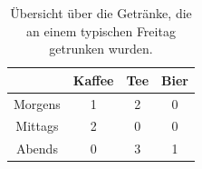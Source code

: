 \begin{table}[tb]
    \centering
    \begin{tabular}{ c | c c c }
        \toprule
                & Kaffee & Tee & Bier\\ 
        \midrule
        Morgens & 1 & 2 & 0\\  
        Mittags & 2 & 0 & 0\\ 
        Abends  & 0 & 3 & 1\\ 
        \bottomrule
    \end{tabular}
    \caption[Getränkeübersicht]{Übersicht über die Getränke, die an einem typischen Freitag  getrunken wurden.}
    \label{table:tab1}
\end{table}

